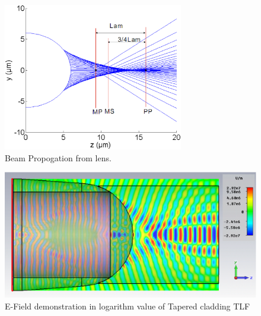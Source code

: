 \begin{figure}[!ht]
\centering
	\includegraphics[width=0.7\textwidth]{bilder/cal_min_spot}
\caption{Beam Propogation from lens.}
\label{fig:lens_spot}
\end{figure}
\begin{figure}[!ht]
	\centering
		\includegraphics[width=0.8 \textwidth]{bilder/cst_lensed_fiber_equ_efield}
		\caption{E-Field demonstration in logarithm value of Tapered cladding TLF}
 		\label{fig:Tapered_cladding_efield}
\end{figure}

